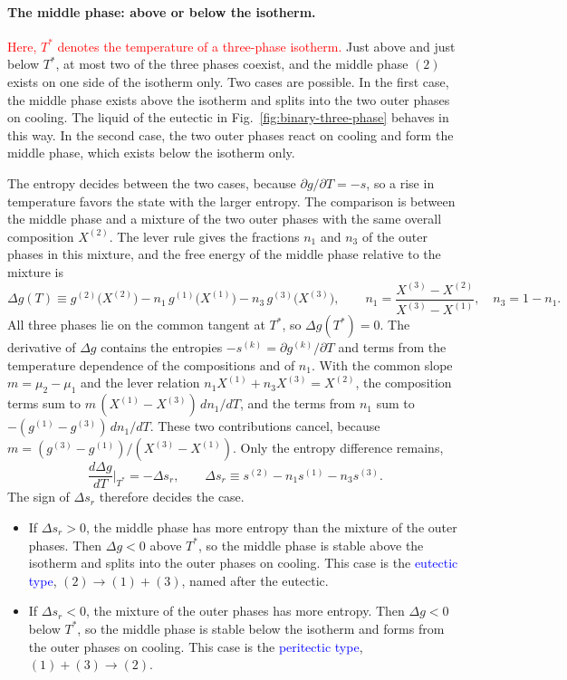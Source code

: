 \paragraph{The middle phase: above or below the isotherm.}
\textcolor{red}{Here, $T^\ast$ denotes the temperature of a three-phase
isotherm.}
Just above and just below $T^\ast$, at most two of the three phases coexist,
and the middle phase $(2)$ exists on one side of the isotherm only. Two cases
are possible. In the first case, the middle phase exists above the isotherm
and splits into the two outer phases on cooling. The liquid of the eutectic
in Fig.~\ref{fig:binary-three-phase} behaves in this way. In the second
case, the two outer phases react on cooling and form the middle phase, which
exists below the isotherm only.

The entropy decides between the two cases, because $\partial g/\partial
T=-s$, so a rise in temperature favors the state with the larger entropy.
The comparison is between the middle phase and a mixture of the two outer
phases with the same overall composition $X^{(2)}$. The lever rule gives the
fractions $n_1$ and $n_3$ of the outer phases in this mixture, and the free
energy of the middle phase relative to the mixture is
\begin{equation*}
    \Delta g(T)\equiv g^{(2)}\big(X^{(2)}\big)
    -n_1\,g^{(1)}\big(X^{(1)}\big)-n_3\,g^{(3)}\big(X^{(3)}\big),
    \qquad
    n_1=\frac{X^{(3)}-X^{(2)}}{X^{(3)}-X^{(1)}},\quad n_3=1-n_1.
\end{equation*}
All three phases lie on the common tangent at $T^\ast$, so $\Delta
g(T^\ast)=0$. The derivative of $\Delta g$ contains the entropies
$-s^{(k)}=\partial g^{(k)}/\partial T$ and terms from the temperature
dependence of the compositions and of $n_1$. With the common slope
$m=\mu_2-\mu_1$ and the lever relation $n_1X^{(1)}+n_3X^{(3)}=X^{(2)}$, the
composition terms sum to $m\,(X^{(1)}-X^{(3)})\,dn_1/dT$, and the terms from
$n_1$ sum to $-(g^{(1)}-g^{(3)})\,dn_1/dT$. These two contributions cancel,
because $m=(g^{(3)}-g^{(1)})/(X^{(3)}-X^{(1)})$. Only the entropy difference
remains,
\begin{equation}
    \boxed{\frac{d\Delta g}{dT}\bigg|_{T^\ast}=-\Delta s_r,\qquad
    \Delta s_r\equiv s^{(2)}-n_1s^{(1)}-n_3s^{(3)}.}
\end{equation}
The sign of $\Delta s_r$ therefore decides the case.
\begin{itemize}
    \item If $\Delta s_r>0$, the middle phase has more entropy than the
    mixture of the outer phases. Then $\Delta g<0$ above $T^\ast$, so the
    middle phase is stable above the isotherm and splits into the outer
    phases on cooling. This case is the \textcolor{blue}{eutectic type},
    $(2)\to(1)+(3)$, named after the eutectic.
    \item If $\Delta s_r<0$, the mixture of the outer phases has more
    entropy. Then $\Delta g<0$ below $T^\ast$, so the middle phase is stable
    below the isotherm and forms from the outer phases on cooling. This case
    is the \textcolor{blue}{peritectic type}, $(1)+(3)\to(2)$.
\end{itemize}
